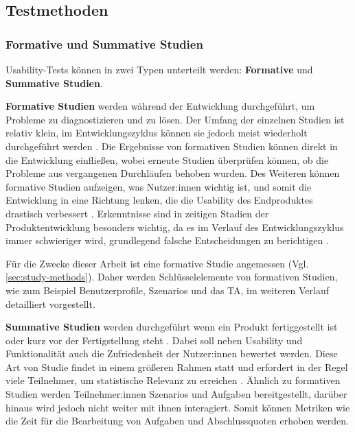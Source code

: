 \subsection{Testmethoden}
\subsubsection{Formative und Summative Studien}
\label{sec:formative-summative}
Usability-Tests können in zwei Typen unterteilt werden: \textbf{Formative} und \textbf{Summative
  Studien}.

\pskip
\textbf{Formative Studien} werden während der Entwicklung durchgeführt, um Probleme zu diagnostizieren und zu lösen. Der Umfang der einzelnen Studien ist relativ klein, im Entwicklungszyklus können sie jedoch meist wiederholt durchgeführt werden \parencite{barnumUsabilityTesting2021}. Die Ergebnisse von formativen Studien können direkt in die Entwicklung einfließen, wobei erneute Studien überprüfen können, ob die Probleme aus vergangenen Durchläufen behoben wurden. Des Weiteren können formative Studien aufzeigen, was Nutzer:innen wichtig ist, und somit die Entwicklung in eine Richtung lenken, die die Usability des Endproduktes drastisch verbessert \parencite{barnumUsabilityTesting2021}. Erkenntnisse sind in zeitigen Stadien der Produktentwicklung besonders wichtig, da es im Verlauf des Entwicklungszyklus immer schwieriger wird, grundlegend falsche Entscheidungen zu berichtigen \parencite{barnumUsabilityTesting2021}.

Für die Zwecke dieser Arbeit ist eine formative Studie angemessen (Vgl. \ref{sec:study-methods}). Daher werden Schlüsselelemente von formativen Studien, wie zum Beispiel Benutzerprofile, Szenarios und das \acl{TA}, im weiteren Verlauf detailliert vorgestellt.

\pskip
\textbf{Summative Studien} werden durchgeführt wenn ein Produkt fertiggestellt ist oder kurz vor der Fertigstellung steht \parencite{barnumUsabilityTesting2021}. Dabei soll neben Usability und Funktionalität auch die Zufriedenheit der Nutzer:innen bewertet werden. Diese Art von Studie findet in einem größeren Rahmen statt und erfordert in der Regel viele Teilnehmer, um statistische Relevanz zu erreichen \parencite{barnumUsabilityTesting2021}. Ähnlich zu formativen Studien werden Teilnehmer:innen Szenarios und Aufgaben bereitgestellt, darüber hinaus wird jedoch nicht weiter mit ihnen interagiert. Somit können Metriken wie die Zeit für die Bearbeitung von Aufgaben und Abschlussquoten erhoben werden.

